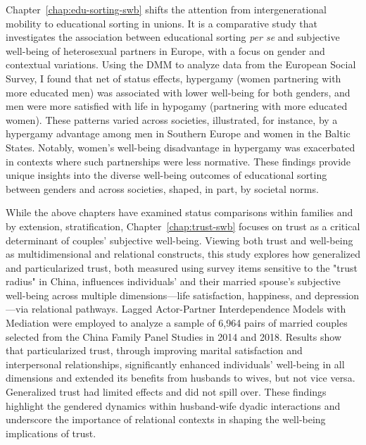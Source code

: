 Chapter~\ref{chap:edu-sorting-swb} shifts the attention from intergenerational mobility to educational sorting in unions. It is a comparative study that investigates the association between educational sorting \textit{per se} and subjective well-being of heterosexual partners in Europe, with a focus on gender and contextual variations. Using the DMM to analyze data from the European Social Survey, I found that net of status effects, hypergamy (women partnering with more educated men) was associated with lower well-being for both genders, and men were more satisfied with life in hypogamy (partnering with more educated women). These patterns varied across societies, illustrated, for instance, by a hypergamy advantage among men in Southern Europe and women in the Baltic States. Notably, women's well-being disadvantage in hypergamy was exacerbated in contexts where such partnerships were less normative. These findings provide unique insights into the diverse well-being outcomes of educational sorting between genders and across societies, shaped, in part, by societal norms.

While the above chapters have examined status comparisons within families and by extension, stratification, Chapter~\ref{chap:trust-swb} focuses on trust as a critical determinant of couples' subjective well-being. Viewing both trust and well-being as multidimensional and relational constructs, this study explores how generalized and particularized trust, both measured using survey items sensitive to the "trust radius" in China, influences individuals' and their married spouse's subjective well-being across multiple dimensions—life satisfaction, happiness, and depression—via relational pathways. Lagged Actor-Partner Interdependence Models with Mediation were employed to analyze a sample of 6,964 pairs of married couples selected from the China Family Panel Studies in 2014 and 2018. Results show that particularized trust, through improving marital satisfaction and interpersonal relationships, significantly enhanced individuals' well-being in all dimensions and extended its benefits from husbands to wives, but not vice versa. Generalized trust had limited effects and did not spill over. These findings highlight the gendered dynamics within husband-wife dyadic interactions and underscore the importance of relational contexts in shaping the well-being implications of trust.
